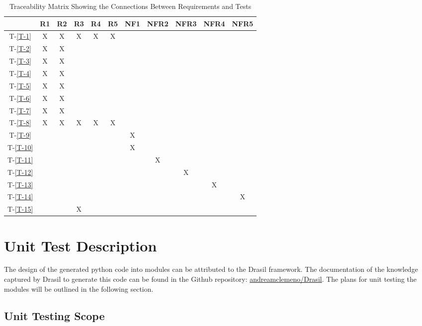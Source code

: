 \documentclass[12pt, titlepage]{article}
\newcommand{\tinref}[1]{T-\ref{#1}}
\begin{document}
\begin{table}[H]
\centering
\begin{tabular}{||c||c|c|c|c|c|c|c|c|c|c||}
\hline
	& R1 & R2 & R3 & R4 & R5 & NF1 & NFR2 & NFR3 & NFR4 & NFR5 \\
\hline
\tinref{T-1}        	& X& X& X& X& X& & & & & \\
\hline
\tinref{T-2}			& X& X& & & & & & & &\\
\hline
\tinref{T-3}        	& X& X& & & & & & & &\\
\hline
\tinref{T-4}			& X& X& & & & & & &  &\\
\hline
\tinref{T-5}        	& X& X& & & & & & & &\\
\hline
\tinref{T-6}			& X& X& & & & & & & &\\
\hline
\tinref{T-7}        	& X& X& & & & & & & &\\
\hline
\tinref{T-8}			& X& X&X & X& X& & & & &\\ 
\hline
\tinref{T-9}        	& & & & & &X & & & &\\
\hline
\tinref{T-10}			& & & & & &X & & & &\\
\hline
\tinref{T-11}        	& & & & & & &X & & &\\
\hline
\tinref{T-12}			& & & & & & & &X & &\\ 
\hline
\tinref{T-13}        	& & & & & & & & &X &\\
\hline
\tinref{T-14}			& & & & & & & & & &X\\
\hline
\tinref{T-15}        	& & &X & & & & & & &\\
\hline

\end{tabular}
\caption{Traceability Matrix Showing the Connections Between Requirements and 
Tests}
\label{Table:R_trace}
\end{table}


\section{Unit Test Description} \label{unittestcases}


The design of the generated python code into modules can be attributed to the 
Drasil framework. The documentation of the knowledge captured by Drasil to 
generate this code can be found in the Github repository: \href{https://github.com/andreamclemeno/Drasil}{andreamclemeno/Drasil}. 
The plans for unit testing the modules will be outlined in the following 
section.


\subsection{Unit Testing Scope}
\end{document}
